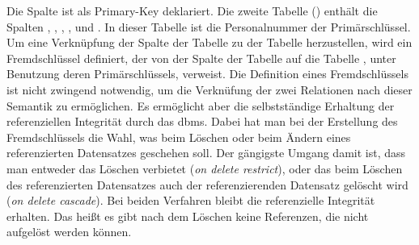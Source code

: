 Die Spalte  ist als Primary-Key deklariert.
Die zweite Tabelle  () enthält die Spalten 
, , , ,  und .
In dieser Tabelle ist die Personalnummer der Primärschlüssel.
Um eine Verknüpfung der Spalte  der Tabelle  zu der Tabelle  herzustellen, 
wird ein Fremdschlüssel definiert, der von der Spalte  der Tabelle  auf die Tabelle , 
unter Benutzung deren Primärschlüssels, verweist.
Die Definition eines Fremdschlüssels ist nicht zwingend notwendig, um die Verknüfung der zwei Relationen nach dieser Semantik zu ermöglichen.
Es ermöglicht aber die selbstständige Erhaltung der referenziellen In­te­g­ri­tät durch das \ac{dbms}. 
Dabei hat man bei der Erstellung des Fremdschlüssels die Wahl, was beim Löschen oder beim Ändern eines referenzierten Datensatzes geschehen soll.
Der gängigste Umgang damit ist, dass man entweder das Löschen verbietet (\emph{on delete restrict}),
oder das beim Löschen des referenzierten Datensatzes auch der referenzierenden Datensatz gelöscht wird (\emph{on delete cascade}).
Bei beiden Verfahren bleibt die referenzielle In­te­g­ri­tät erhalten.
Das heißt es gibt nach dem Löschen keine Referenzen, die nicht aufgelöst werden können.

